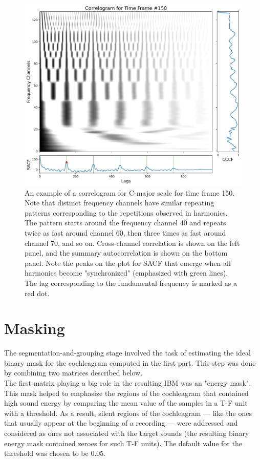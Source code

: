 \begin{figure}[t]
	\centering
	\includegraphics[width=\textwidth]{include/correlogram_example}
	\caption[An example of correlogram and the extracted features for C-major scale]{An example of a correlogram for C-major scale for time frame 150. Note that distinct frequency channels have similar repeating patterns corresponding to the repetitions observed in harmonics. The pattern starts around the frequency channel 40 and repeats twice as fast around channel 60, then three times as fast around channel 70, and so on. Cross-channel correlation is shown on the left panel, and the summary autocorrelation is shown on the bottom panel. Note the peaks on the plot for SACF that emerge when all harmonics become "synchronized" (emphasized with green lines). The lag corresponding to the fundamental frequency is marked as a red dot.}
	\label{img:correlogram_example}
\end{figure}

\section{Masking}

The segmentation-and-grouping stage involved the task of estimating the ideal binary mask for the cochleagram computed in the first part. This step was done by combining two matrices described below.\\

The first matrix playing a big role in the resulting IBM was an "energy mask". This mask helped to emphasize the regions of the cochleagram that contained high sound energy by comparing the mean value of the samples in a T-F unit with a threshold. As a result, silent regions of the cochleagram --- like the ones that usually appear at the beginning of a recording --- were addressed and considered as ones not associated with the target sounds (the resulting binary energy mask contained zeroes for such T-F units). The default value for the threshold was chosen to be $0.05$.\\

